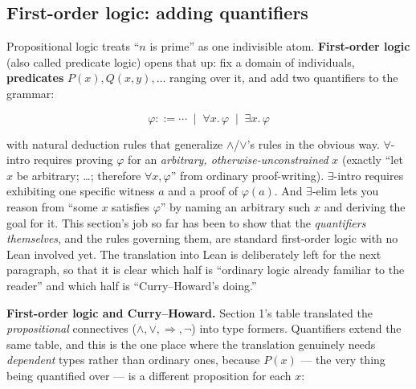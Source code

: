 \subsection{First-order logic: adding quantifiers}\label{sec:03-propositions-and-proofs:02-logic-recap:6}

Propositional logic treats ``\(n\) is prime'' as one indivisible atom. \textbf{First-order logic} (also called predicate logic) opens that up: fix a domain of individuals, \textbf{predicates} \(P(x), Q(x, y), \dots\) ranging over it, and add two quantifiers to the grammar:

\[
\varphi ::= \cdots \;\mid\; \forall x.\, \varphi \;\mid\; \exists x.\, \varphi
\]

with natural deduction rules that generalize \(\wedge\)/\(\vee\)'s rules in the obvious way. \(\forall\)-intro requires proving \(\varphi\) for an \emph{arbitrary, otherwise-unconstrained} \(x\) (exactly ``let \(x\) be arbitrary; \ldots; therefore \(\forall x, \varphi\)'' from ordinary proof-writing). \(\exists\)-intro requires exhibiting one specific witness \(a\) and a proof of \(\varphi(a)\). And \(\exists\)-elim lets you reason from ``some \(x\) satisfies \(\varphi\)'' by naming an arbitrary such \(x\) and deriving the goal for it. This section's job so far has been to show that the \emph{quantifiers themselves}, and the rules governing them, are standard first-order logic with no Lean involved yet. The translation into Lean is deliberately left for the next paragraph, so that it is clear which half is ``ordinary logic already familiar to the reader'' and which half is ``Curry--Howard's doing.''

\textbf{First-order logic and Curry--Howard.} Section 1's table translated the \emph{propositional} connectives (\(\wedge, \vee, \Rightarrow, \neg\)) into type formers. Quantifiers extend the same table, and this is the one place where the translation genuinely needs \emph{dependent} types rather than ordinary ones, because \(P(x)\) --- the very thing being quantified over --- is a different proposition for each \(x\):

